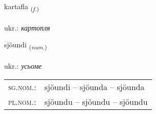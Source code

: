 \documentclass[frontgrid, backgrid]{flacards}\usepackage[]{graphicx}\usepackage[]{xcolor}
\begin{document}
\renewcommand{\flhead}{\vskip5pt \fboxsep=0pt {\small\bfseries\footnotesize Nafnorð | іменник}}
\renewcommand{\fcfoot}{\vskip5pt \fboxsep=0pt \hspace{2pt}{\small\bfseries\footnotesize 3K}}

\renewcommand{\blhead}{\vskip5pt {\small\bfseries\footnotesize Nafnorð | іменник }}
\renewcommand{\bcfoot}{\vskip5pt \hspace{2pt}{\small\bfseries\footnotesize 3K}}


{kartafla \small{\textsubscript{(\textit{f.})}} \\[1ex] %
 \\
ukr.: \emph{картопля} \\  [2ex]
\renewcommand*{\arraystretch}{0.8}
}

\renewcommand{\flhead}{\vskip5pt \fboxsep=0pt {\small\bfseries\footnotesize Töluorð | чисельник}}
\renewcommand{\fcfoot}{\vskip5pt \fboxsep=0pt \hspace{2pt}{\small\bfseries\footnotesize 3K}}

\renewcommand{\blhead}{\vskip5pt {\small\bfseries\footnotesize Töluorð | чисельник }}
\renewcommand{\bcfoot}{\vskip5pt \hspace{2pt}{\small\bfseries\footnotesize 3K}}


{sjöundi \small{\textsubscript{(\textit{num.})}} \\[1ex] %
\textphonetic{[sjœːʏntɪ]} \\
ukr.: \emph{усьоме} \\  [2ex]
\renewcommand*{\arraystretch}{0.8}
\begin{tabular}{ll}
\textsc{sg.nom.}: & sjöundi  --  sjöunda -- sjöunda \\ 
\textsc{pl.nom.}: & sjöundu -- sjöundu -- sjöundu
\end{tabular}
}
\end{document}
